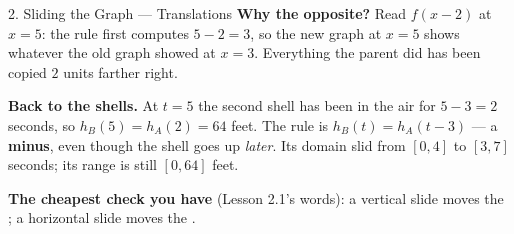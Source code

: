 \documentclass[10pt]{article}
\begin{document}
\begin{notesbox}{2. Sliding the Graph --- Translations}
\vspace{2pt}
\textbf{Why the opposite?} Read $f(x-2)$ at $x=5$: the rule first computes $5-2=3$, so the new
graph at $x=5$ shows whatever the old graph showed at $x=3$. Everything the parent did has been
copied $2$ units farther right.

\vspace{4pt}
\textbf{Back to the shells.} At $t=5$ the second shell has been in the air for $5-3=2$ seconds, so
$h_B(5)=h_A(2)=64$ feet. The rule is $h_B(t)=h_A(t-3)$ --- a \textbf{minus}, even though the shell
goes up \emph{later}. Its domain slid from $[0,4]$ to $[3,7]$ seconds; its range is still
$[0,64]$ feet.

\vspace{4pt}
\textbf{The cheapest check you have} (Lesson 2.1's words): a vertical slide moves the
\blank{2.2cm}; a horizontal slide moves the \blank{2.2cm}.
\end{notesbox}

\vspace{0.10in}
\end{document}
